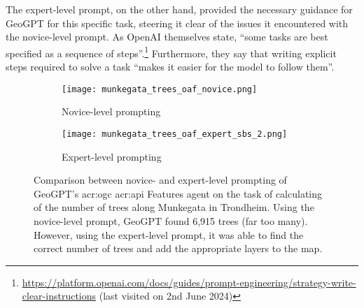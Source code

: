 The expert-level prompt, on the other hand, provided the necessary guidance for GeoGPT for this specific task, steering it clear of the issues it encountered with the novice-level prompt. As OpenAI themselves state, \enquote{some tasks are best specified as a sequence of steps}.\footnote{\url{https://platform.openai.com/docs/guides/prompt-engineering/strategy-write-clear-instructions} (last visited on 2nd June 2024)} Furthermore, they say that writing explicit steps required to solve a task \enquote{makes it easier for the model to follow them}.

\begin{figure}[htbp]
    \centering
    \begin{subfigure}[b]{0.7\textwidth}
        \centering
        \texttt{[image: munkegata\_trees\_oaf\_novice.png]}
        \caption{Novice-level prompting}
        \label{fig:novice-level-prompting-munkegata-trees}
    \end{subfigure}
    \hfill
    \begin{subfigure}[b]{0.7\textwidth}
        \centering
        \texttt{[image: munkegata\_trees\_oaf\_expert\_sbs\_2.png]}
        \caption{Expert-level prompting}
        \label{fig:expert-level-prompting-munkegata-trees}
    \end{subfigure}
    \caption[Comparison between novice- and expert-level prompting of GeoGPT for calculating the number of trees along Munkegata in Trondheim.]{Comparison between novice- and expert-level prompting of GeoGPT's \acrshort{acr:ogc} \acrshort{acr:api} Features agent on the task of calculating of the number of trees along Munkegata in Trondheim. Using the novice-level prompt, GeoGPT found 6,915 trees (far too many). However, using the expert-level prompt, it was able to find the correct number of trees and add the appropriate layers to the map.
    }
    \label{fig:novice-vs-expert-munkegata-trees}
\end{figure}


\glsresetall